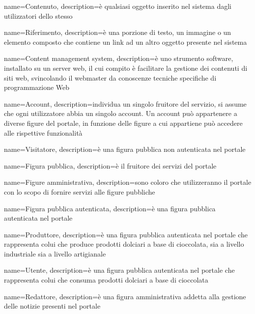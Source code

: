 
{
    name={Contenuto},
    description={è qualsiasi oggetto inserito nel sistema dagli utilizzatori dello stesso}
}

{
    name={Riferimento},
    description={è una porzione di testo, un immagine o un elemento composto che contiene un link ad un altro oggetto presente nel sistema}
}

{
    name={Content management system},
    description={è uno strumento software, installato su un server web, il cui
        compito è facilitare la gestione dei contenuti di siti web, svincolando il
        webmaster da conoscenze tecniche specifiche di programmazione Web}
}


{
    name={Account},
    description={individua un singolo fruitore del servizio, si assume che ogni utilizzatore abbia un singolo account. Un account può appartenere a diverse figure del portale, in funzione delle figure a cui appartiene può accedere alle rispettive funzionalità}
}

{
    name={Visitatore},
    description={è una figura pubblica non autenticata nel portale}
}

{
    name={Figura pubblica},
    description={è il fruitore dei servizi del portale}
}

{
    name={Figure amministrativa},
    description={sono coloro che utilizzeranno il portale con lo scopo di fornire servizi alle figure pubbliche}
}

{
    name={Figura pubblica autenticata},
    description={è una figura pubblica autenticata nel portale}
}

{
    name={Produttore},
    description={è una figura pubblica autenticata nel portale che rappresenta colui che produce prodotti dolciari a base di cioccolata, sia a livello industriale sia a livello artigianale}
}

{
    name={Utente},
    description={è una figura pubblica autenticata nel portale che rappresenta colui che consuma prodotti dolciari a base di cioccolata}
}

{
    name={Redattore},
    description={è una figura amministrativa addetta alla gestione delle notizie presenti nel portale}
}


